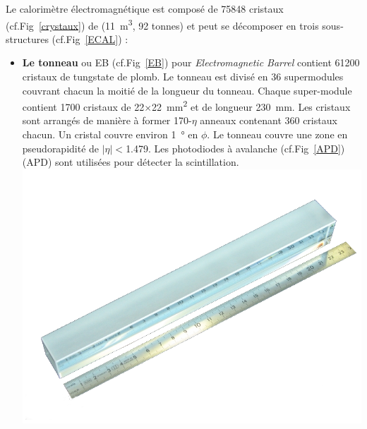 Le calorimètre électromagnétique est composé de \num{75848} cristaux (cf.Fig~\ref{crystaux}) de  (\SI{11}{\cubic\meter}, \num{92} tonnes) et peut se décomposer en trois sous-structures (cf.Fig~\ref{ECAL}) :
\begin{itemize}[label=$\bullet$]
	\item \textbf{Le tonneau} ou EB (cf.Fig~\ref{EB}) pour \textit{Electromagnetic Barrel} contient \num{61200} cristaux de tungstate de plomb. Le tonneau est divisé en \num{36} supermodules couvrant chacun la moitié de la longueur du tonneau. Chaque super-module contient \num{1700} cristaux de \num{22}$\times$\SI{22}{\square\milli\meter} et de longueur \SI{230}{\milli\meter}. Les cristaux sont arrangés de manière à former \num{170}-$\eta$ anneaux contenant \num{360} cristaux chacun. Un cristal couvre environ \SI{1}{\degree} en $\phi$. Le tonneau couvre une zone en pseudorapidité de $|\eta|<$\num{1.479}. Les photodiodes à avalanche (cf.Fig~\ref{APD}) (APD) sont utilisées pour détecter la scintillation.
	\marginpar
	{
		\centering
		\includegraphics[width=\marginparwidth]{CMS/Crystaux.png}
		\label{crystaux}
	}
	

\end{itemize}
